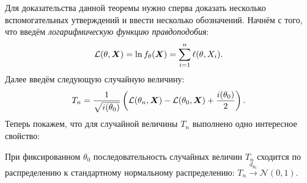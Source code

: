 Для доказательства данной теоремы нужно сперва доказать несколько вспомогательных утверждений и ввести несколько обозначений. Начнём с того, что введём \emph{логарифмическую функцию правдоподобия}:
\[
    \mathcal{L}(\theta, \bm{X}) = \ln f_{\theta}(\bm{X}) = \sum_{i = 1}^{n} \ell(\theta, X_{i}).
\]
Далее введём следующую случайную величину:
\[
    T_{n} = \frac{1}{\sqrt{i(\theta_{0})}}\left(\mathcal{L}(\theta_{n}, \bm{X}) - \mathcal{L}(\theta_{0}, \bm{X}) + \frac{i(\theta_{0})}{2}\right).
\]
Теперь покажем, что для случайной величины $T_{n}$ выполнено одно интересное свойство:
\begin{lemma}
    При фиксированном $\theta_{0}$ последовательность случайных величин $T_{n}$ сходится по распределению к стандартному нормальному распределению: $T_{n} \xrightarrow{d_{\theta_{0}}} \mathcal{N}(0, 1)$.
\end{lemma}
